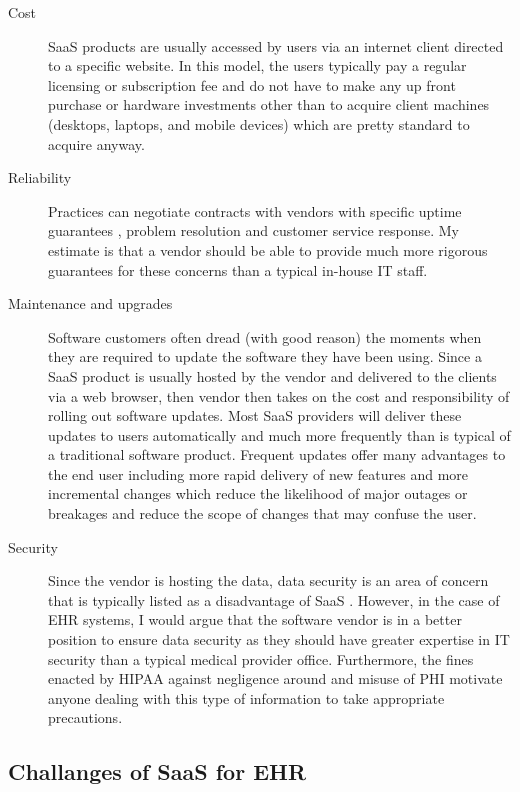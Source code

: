 \documentclass[10pt]{article}
\begin{document}
\begin{description}
\item[Cost]
SaaS products are usually accessed by users via an internet client directed to a specific website.
In this model, the users typically pay a regular licensing or subscription fee and do not have to make any up front purchase or hardware investments other than to acquire client machines (desktops, laptops, and mobile devices) which are pretty standard to acquire anyway.
\item[Reliability]
Practices can negotiate contracts with vendors with specific uptime guarantees \cite{wiki-saas}, problem resolution and customer service response.
My estimate is that a vendor should be able to provide much more rigorous guarantees for these concerns than a typical in-house IT staff.

\item[Maintenance and upgrades]
Software customers often dread (with good reason) the moments when they are required to update the software they have been using.
Since a SaaS product is usually hosted by the vendor and delivered to the clients via a web browser, then vendor then takes on the cost and responsibility of rolling out software updates.
Most SaaS providers will deliver these updates to users automatically and much more frequently than is typical of a traditional software product.
Frequent updates offer many advantages to the end user including more rapid delivery of new features and more incremental changes which reduce the likelihood of major outages or breakages and reduce the scope of changes that may confuse the user.

\item[Security]
Since the vendor is hosting the data, data security is an area of concern that is typically listed as a disadvantage of SaaS \cite{wiki-saas}.
However, in the case of EHR systems, I would argue that the software vendor is in a better position to ensure data security as they should have greater expertise in IT security than a typical medical provider office.
Furthermore, the fines enacted by HIPAA against negligence around and misuse of PHI motivate anyone dealing with this type of information to take appropriate precautions.

\end{description}

\subsection{Challanges of SaaS for EHR}
\label{sec:SaaS Challenges}
\end{document}
